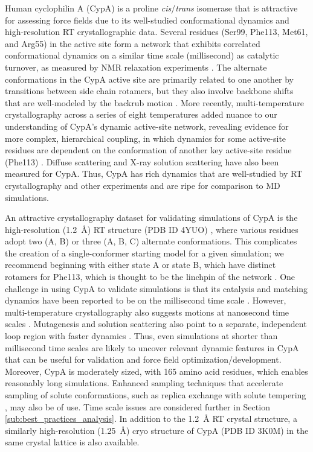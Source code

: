 \documentclass[9pt,review,pubversion]{livecoms}
\begin{document}
Human cyclophilin A (CypA) is a proline \textit{cis}/\textit{trans} isomerase that is attractive for assessing force fields due to its well-studied conformational dynamics and high-resolution RT crystallographic data.
Several residues (Ser99, Phe113, Met61, and Arg55) in the active site form a network that exhibits correlated conformational dynamics on a similar time scale (millisecond) as catalytic turnover, as measured by NMR relaxation experiments \cite{eisenmesser_intrinsic_2005}.
The alternate conformations in the CypA active site are primarily related to one another by transitions between side chain rotamers, but they also involve backbone shifts that are well-modeled by the backrub motion \cite{davis_backrub_2006,friedland_simple_2008}.
More recently, multi-temperature crystallography across a series of eight temperatures added nuance to our understanding of CypA’s dynamic active-site network, revealing evidence for more complex, hierarchical coupling, in which dynamics for some active-site residues are dependent on the conformation of another key active-site residue (Phe113) \cite{keedy_mapping_2015}.
Diffuse scattering \cite{van_benschoten_measuring_2016} and X-ray solution scattering \cite{thompson_temperature-jump_2019} have also been measured for CypA.
Thus, CypA has rich dynamics that are well-studied by RT crystallography and other experiments and are ripe for comparison to MD simulations.

An attractive crystallography dataset for validating simulations of CypA is the high-resolution (\qty{1.2}{\angstrom}) RT structure (PDB ID 4YUO) \cite{keedy_mapping_2015}, where various residues adopt two (A, B) or three (A, B, C) alternate conformations.
This complicates the creation of a single-conformer starting model for a given simulation; we recommend beginning with either state A or state B, which have distinct rotamers for Phe113, which is thought to be the linchpin of the network \cite{keedy_mapping_2015}.
One challenge in using CypA to validate simulations is that its catalysis and matching dynamics have been reported to be on the millisecond time scale \cite{eisenmesser_intrinsic_2005}.
However, multi-temperature crystallography also suggests motions at nanosecond time scales \cite{keedy_mapping_2015}.
Mutagenesis and solution scattering also point to a separate, independent loop region with faster dynamics \cite{thompson_temperature-jump_2019}.
Thus, even simulations at shorter than millisecond time scales are likely to uncover relevant dynamic features in CypA that can be useful for validation and force field optimization/development.
Moreover, CypA is moderately sized, with 165 amino acid residues, which enables reasonably long simulations.
Enhanced sampling techniques \cite{henin_enhanced_2022} that accelerate sampling of solute conformations, such as replica exchange with solute tempering \cite{wang_replica_2011}, may also be of use.
Time scale issues are considered further in Section \ref{sub:best_practices_analysis}.
In addition to the \qty{1.2}{\angstrom} RT crystal structure, a similarly high-resolution (\qty{1.25}{\angstrom}) cryo structure of CypA (PDB ID 3K0M) \cite{fraser_hidden_2009} in the same crystal lattice is also available.
\end{document}
